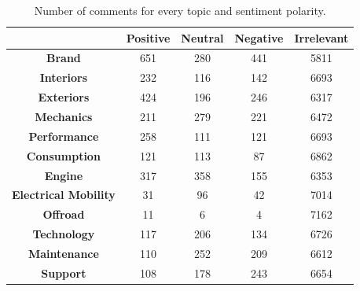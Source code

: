 \begin{table}[H]
	\renewcommand{\arraystretch}{1.3}
	\centering
	\begin{tabular}{| c | c | c | c | c |} 
		\hline
		& \textbf{Positive} & \textbf{Neutral} & \textbf{Negative} & \textbf{Irrelevant} \\ [.06cm]
		\hline
		\hline
		\textbf{Brand}& 651 & 280 & 441 & 5811 \\ [.06cm]
		\hline
		\textbf{Interiors}& 232 & 116 & 142 & 6693 \\ [.06cm]
		\hline
		\textbf{Exteriors}& 424 & 196 & 246 & 6317  \\ [.06cm]
		\hline
		\textbf{Mechanics}& 211 & 279 & 221 & 6472 \\ [.06cm]
		\hline
		\textbf{Performance}& 258 & 111 & 121 & 6693 \\ [.06cm]
		\hline
		\textbf{Consumption}& 121 & 113 & 87 & 6862 \\ [.06cm]
		\hline
		\textbf{Engine}& 317 & 358 & 155 & 6353 \\ [.06cm]
		\hline
		\textbf{Electrical Mobility}& 31 & 96 & 42 & 7014 \\ [.06cm]
		\hline
		\textbf{Offroad}& 11 & 6 & 4 & 7162 \\ [.06cm]
		\hline
		\textbf{Technology}& 117 & 206 & 134 & 6726 \\ [.06cm]
		\hline
		\textbf{Maintenance}& 110 & 252 & 209 & 6612 \\ [.06cm]
		\hline
		\textbf{Support}& 108 & 178 & 243 & 6654 \\ [.06cm]
		\hline
		
	\end{tabular}
	\caption{Number of comments for every topic and sentiment polarity.}
	\label{table:annotations-distribution}
\end{table}

